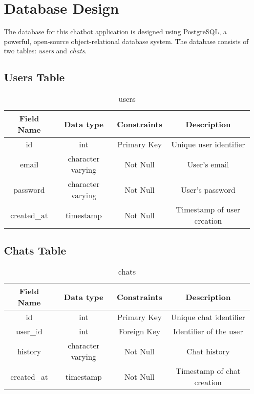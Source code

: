 \section{Database Design}
The database for this chatbot application is designed using PostgreSQL, a powerful, open-source object-relational database system. The database consists of two tables: \textit{users} and \textit{chats}.

\subsection{Users Table}


\begin{table}[h!]
  \centering
  \caption{users}
  \vspace*{10pt}
  \begin{tabular}{|c|c|c|c|}
    \hline
    Field Name & Data type & Constraints & Description\\ \hline
    id & int & Primary Key & Unique user identifier\\ \hline
    email & character varying & Not Null & User's email\\ \hline
    password & character varying & Not Null & User's password\\ \hline
    created\_at & timestamp & Not Null & Timestamp of user creation\\ \hline
  \end{tabular}
\end{table}

\subsection{Chats Table}

\begin{table}[h!]
  \centering
  \caption{chats}
  \vspace*{10pt}
  \begin{tabular}{|c|c|c|c|}
    \hline
    Field Name & Data type & Constraints & Description\\ \hline
    id & int & Primary Key & Unique chat identifier\\ \hline
    user\_id & int & Foreign Key & Identifier of the user \\ \hline
    history & character varying & Not Null & Chat history\\ \hline
    created\_at & timestamp & Not Null & Timestamp of chat creation\\ \hline
  \end{tabular}
\end{table}

